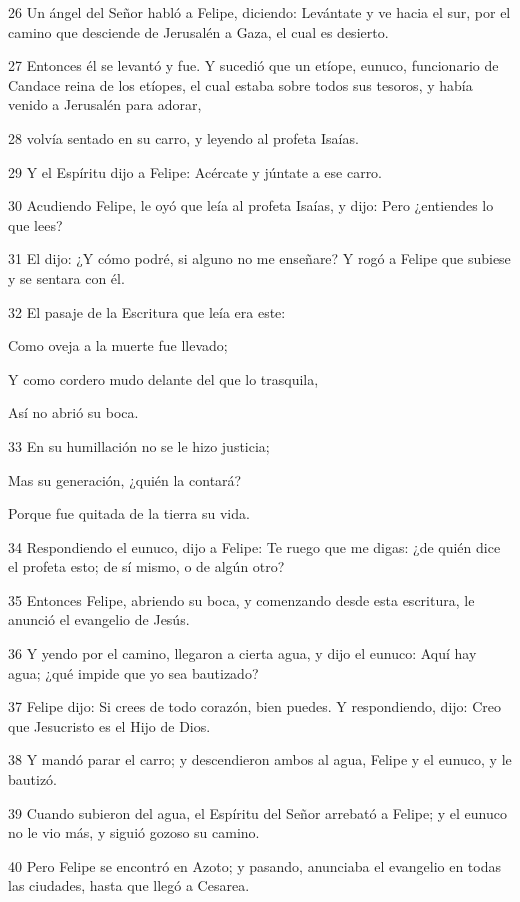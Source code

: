 \par 26 Un ángel del Señor habló a Felipe, diciendo: Levántate y ve hacia el sur, por el camino que desciende de Jerusalén a Gaza, el cual es desierto.
\par 27 Entonces él se levantó y fue. Y sucedió que un etíope, eunuco, funcionario de Candace reina de los etíopes, el cual estaba sobre todos sus tesoros, y había venido a Jerusalén para adorar,
\par 28 volvía sentado en su carro, y leyendo al profeta Isaías.
\par 29 Y el Espíritu dijo a Felipe: Acércate y júntate a ese carro.
\par 30 Acudiendo Felipe, le oyó que leía al profeta Isaías, y dijo: Pero ¿entiendes lo que lees?
\par 31 El dijo: ¿Y cómo podré, si alguno no me enseñare? Y rogó a Felipe que subiese y se sentara con él.
\par 32 El pasaje de la Escritura que leía era este:
\par Como oveja a la muerte fue llevado;
\par Y como cordero mudo delante del que lo trasquila,
\par Así no abrió su boca.
\par 33 En su humillación no se le hizo justicia;
\par Mas su generación, ¿quién la contará?
\par Porque fue quitada de la tierra su vida.
\par 34 Respondiendo el eunuco, dijo a Felipe: Te ruego que me digas: ¿de quién dice el profeta esto; de sí mismo, o de algún otro?
\par 35 Entonces Felipe, abriendo su boca, y comenzando desde esta escritura, le anunció el evangelio de Jesús.
\par 36 Y yendo por el camino, llegaron a cierta agua, y dijo el eunuco: Aquí hay agua; ¿qué impide que yo sea bautizado?
\par 37 Felipe dijo: Si crees de todo corazón, bien puedes. Y respondiendo, dijo: Creo que Jesucristo es el Hijo de Dios.
\par 38 Y mandó parar el carro; y descendieron ambos al agua, Felipe y el eunuco, y le bautizó.
\par 39 Cuando subieron del agua, el Espíritu del Señor arrebató a Felipe; y el eunuco no le vio más, y siguió gozoso su camino.
\par 40 Pero Felipe se encontró en Azoto; y pasando, anunciaba el evangelio en todas las ciudades, hasta que llegó a Cesarea.

